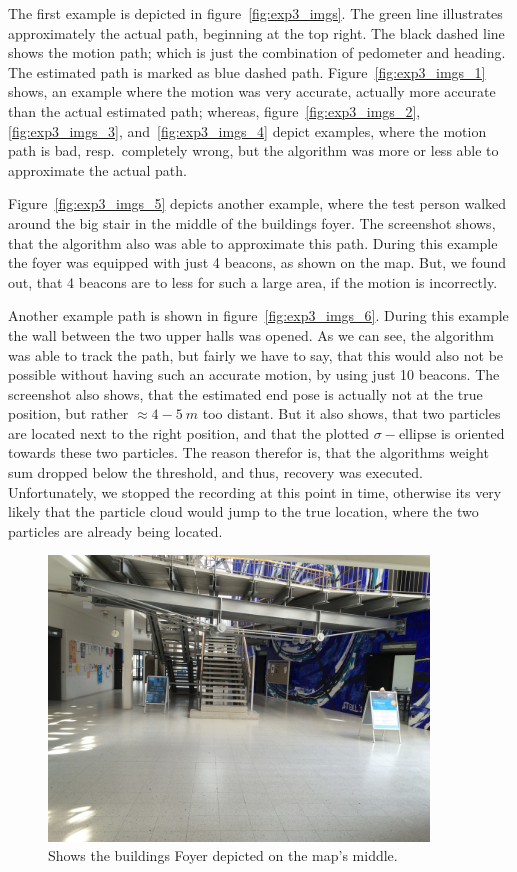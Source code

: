 The first example is depicted in figure~\ref{fig:exp3_imgs}. The green line illustrates approximately the actual path, beginning at the top right. The black dashed line shows the motion path; which is just the combination of pedometer and heading. The estimated path is marked as blue dashed path. Figure~\ref{fig:exp3_imgs_1} shows, an example where the motion was very accurate, actually more accurate than the actual estimated path; whereas, figure~\ref{fig:exp3_imgs_2}, \ref{fig:exp3_imgs_3}, and~\ref{fig:exp3_imgs_4} depict examples, where the motion path is bad, resp.\ completely wrong, but the algorithm was more or less able to approximate the actual path.

Figure~\ref{fig:exp3_imgs_5} depicts another example, where the test person walked around the big stair in the middle of the buildings foyer. The screenshot shows, that the algorithm also was able to approximate this path. During this example the foyer was equipped with just 4 beacons, as shown on the map. But, we found out, that 4 beacons are to less for such a large area, if the motion is incorrectly.

Another example path is shown in figure~\ref{fig:exp3_imgs_6}. During this example the wall between the two upper halls was opened. As we can see, the algorithm was able to track the path, but fairly we have to say, that this would also not be possible without having such an accurate motion, by using just 10 beacons. The screenshot also shows, that the estimated end pose is actually not at the true position, but rather $\approx 4-5~m$ too distant. But it also shows, that two particles are located next to the right position, and that the plotted $\sigma-\text{ellipse}$ is oriented towards these two particles.  The reason therefor is, that the algorithms weight sum dropped below the threshold, and thus, recovery was executed. Unfortunately, we stopped the recording at this point in time, otherwise its very likely that the particle cloud would jump to the true location, where the two particles are already being located. 


\begin{figure}
	\includegraphics[width=0.9\textwidth]{figures/F-Foyer}
	\caption{Shows the buildings Foyer depicted on the map's middle.}
	\label{fig:f-foyer}
\end{figure}


